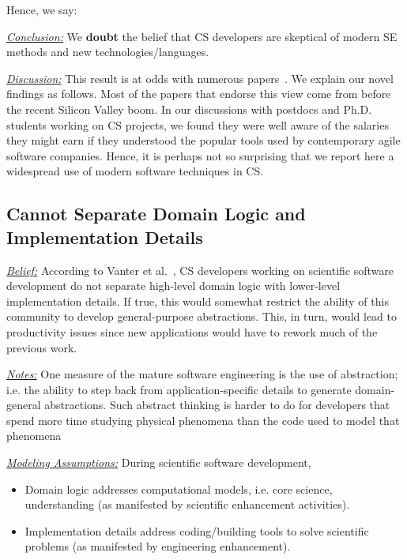 \documentclass[sigconf]{acmart}
\newcommand{\bi}{\begin{itemize}}
\newcommand{\ei}{\end{itemize}}
\newenvironment{RQ}{\vspace{1mm}\begin{tcolorbox}[enhanced,width=3.4in,size=fbox,colback=red!5!white,drop shadow southeast,sharp corners]}{\end{tcolorbox}}
\begin{document}
 

Hence, we say:

\begin{RQ} 
\textit{\underline{Conclusion:}} We \textbf{doubt} the belief that 
CS developers are skeptical of modern SE methods and new technologies/languages.
\end{RQ}

\noindent \textit{\underline{Discussion:}} This result is at odds
with numerous papers~\cite{basili08_hpc, carver07_environment, Prabhu11_cssurvey, kendall05_C, ragan14_pythoncs}. We explain our novel findings as follows. 
Most of the papers that endorse this view come from before the recent Silicon Valley boom. In our discussions with postdocs and Ph.D. students working on CS projects,
we found they were well aware of the salaries they might earn if they understood the popular tools used by contemporary agile software companies. 
Hence, it is perhaps not so surprising that we report here a widespread use of modern software techniques in CS.
 


\subsection{Cannot Separate Domain Logic and Implementation Details} 

\noindent \textit{\underline{Belief:}} 
According to Vanter et al.~\cite{faulk09_secs},
CS developers working on scientific software development do not separate high-level domain logic with
lower-level implementation details. If true, this would somewhat restrict the ability
of this community to develop general-purpose abstractions. This, in turn, would lead
to productivity issues since new applications would have to rework much of the previous
work. 


\noindent \textit{\underline{Notes:}} One measure of the mature software engineering is the
use of abstraction; i.e. the ability to step back from application-specific
details to generate domain-general abstractions. Such abstract thinking is harder to do for developers that spend more time studying physical phenomena than the code used to model that phenomena


\noindent \textit{\underline{Modeling Assumptions:}} During scientific software development,
\bi
\item Domain logic addresses computational models, i.e. core science, understanding (as manifested by scientific enhancement activities). 
\item Implementation details address coding/building   tools   to solve scientific problems (as manifested by engineering enhancement). 
\ei
\end{document}
